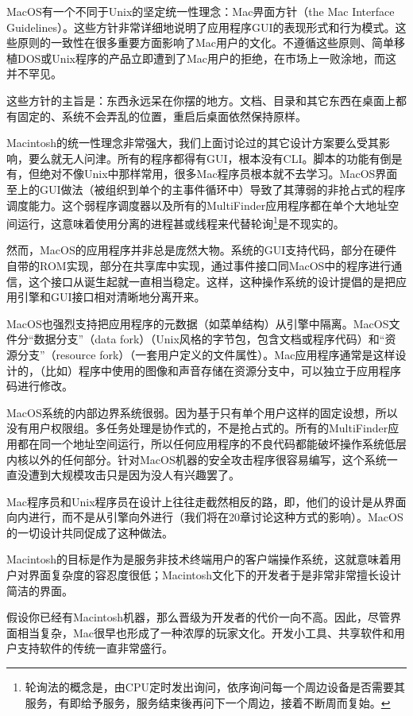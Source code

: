 \documentclass[11pt,oneside]{book}
\begin{document}
\begin{common-format}
MacOS有一个不同于Unix的坚定统一性理念：Mac畀面方针（the Mac Interface Guidelines）。这些方针非常详细地说明了应用程序GUI的表现形式和行为模式。这些原则的一致性在很多重要方面影响了Mac用户的文化。不遵循这些原则、简单移植DOS或Unix程序的产品立即遭到了Mac用户的拒绝，在市场上一败涂地，而这并不罕见。

这些方针的主旨是：东西永远呆在你摆的地方。文档、目录和其它东西在桌面上都有固定的、系统不会弄乱的位置，重启后桌面依然保持原样。

Macintosh的统一性理念非常强大，我们上面讨论过的其它设计方案要么受其影响，要么就无人问津。所有的程序都得有GUI，根本没有CLI。脚本的功能有倒是有，但绝对不像Unix中那样常用，很多Mac程序员根本就不去学习。MacOS界面至上的GUI做法（被组织到单个的主事件循环中）导致了其薄弱的非抢占式的程序调度能力。这个弱程序调度器以及所有的MultiFinder应用程序都在单个大地址空间运行，这意味着使用分离的进程甚或线程来代替轮询\footnote{轮询法的概念是，由CPU定时发出询问，依序询问每一个周边设备是否需要其服务，有即给予服务，服务结束後再问下一个周边，接着不断周而复始。}是不现实的。

然而，MacOS的应用程序并非总是庞然大物。系统的GUI支持代码，部分在硬件自带的ROM实现，部分在共享库中实现，通过事件接口同MacOS中的程序进行通信，这个接口从诞生起就一直相当稳定。这样，这种操作系统的设计提倡的是把应用引擎和GUI接口相对清晰地分离开来。

MacOS也强烈支持把应用程序的元数据（如菜单结构）从引擎中隔离。MacOS文件分“数据分支”（data fork）（Unix风格的字节包，包含文档或程序代码）和“资源分支”（resource fork）（一套用户定义的文件属性）。Mac应用程序通常是这样设计的，（比如）程序中使用的图像和声音存储在资源分支中，可以独立于应用程序码进行修改。

MacOS系统的内部边界系统很弱。因为基于只有单个用户这样的固定设想，所以没有用户权限组。多任务处理是协作式的，不是抢占式的。所有的MultiFinder应用都在同一个地址空间运行，所以任何应用程序的不良代码都能破坏操作系统低层内核以外的任何部分。针对MacOS机器的安全攻击程序很容易编写，这个系统一直没遭到大规模攻击只是因为没人有兴趣罢了。

Mac程序员和Unix程序员在设计上往往走截然相反的路，即，他们的设计是从界面向内进行，而不是从引擎向外进行（我们将在20章讨论这种方式的影响）。MacOS的一切设计共同促成了这种做法。

Macintosh的目标是作为是服务非技术终端用户的客户端操作系统，这就意味着用户对界面复杂度的容忍度很低；Macintosh文化下的开发者于是非常非常擅长设计简洁的界面。

假设你已经有Macintosh机器，那么晋级为开发者的代价一向不高。因此，尽管界面相当复杂，Mac很早也形成了一种浓厚的玩家文化。开发小工具、共享软件和用户支持软件的传统一直非常盛行。


\end{common-format}
\end{document}
